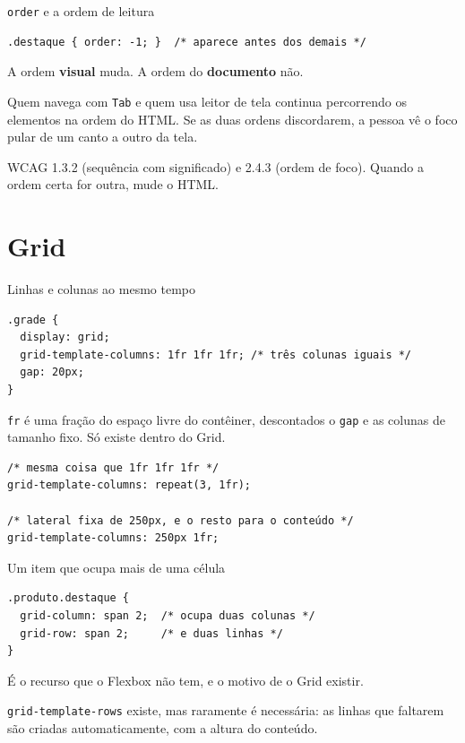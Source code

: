 \documentclass{beamer}
\begin{document}
\begin{frame}[fragile]{\texttt{order} e a ordem de leitura}
	\begin{verbatim}
.destaque { order: -1; }  /* aparece antes dos demais */
  \end{verbatim}

	\vspace{0.3cm}
	A ordem \textbf{visual} muda. A ordem do \textbf{documento} não.

	\vspace{0.3cm}
	Quem navega com \texttt{Tab} e quem usa leitor de tela continua percorrendo os
	elementos na ordem do HTML. Se as duas ordens discordarem, a pessoa vê o foco
	pular de um canto a outro da tela.

	\vspace{0.3cm}
	WCAG 1.3.2 (sequência com significado) e 2.4.3 (ordem de foco). Quando a ordem
	certa for outra, mude o HTML.
\end{frame}

\section{Grid}

\begin{frame}[fragile]{Linhas e colunas ao mesmo tempo}
	\begin{verbatim}
.grade {
  display: grid;
  grid-template-columns: 1fr 1fr 1fr; /* três colunas iguais */
  gap: 20px;
}
  \end{verbatim}

	\vspace{0.3cm}
	\texttt{fr} é uma fração do espaço livre do contêiner, descontados o
	\texttt{gap} e as colunas de tamanho fixo. Só existe dentro do Grid.

	\begin{verbatim}
/* mesma coisa que 1fr 1fr 1fr */
grid-template-columns: repeat(3, 1fr);

/* lateral fixa de 250px, e o resto para o conteúdo */
grid-template-columns: 250px 1fr;
  \end{verbatim}
\end{frame}

\begin{frame}[fragile]{Um item que ocupa mais de uma célula}
	\begin{verbatim}
.produto.destaque {
  grid-column: span 2;  /* ocupa duas colunas */
  grid-row: span 2;     /* e duas linhas */
}
  \end{verbatim}

	\vspace{0.4cm}
	É o recurso que o Flexbox não tem, e o motivo de o Grid existir.

	\vspace{0.4cm}
	\texttt{grid-template-rows} existe, mas raramente é necessária: as linhas que
	faltarem são criadas automaticamente, com a altura do conteúdo.
\end{frame}
\end{document}
